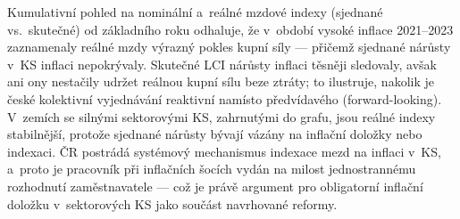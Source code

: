 Kumulativní pohled na nominální a~reálné mzdové indexy (sjednané vs.\ skutečné) od základního roku odhaluje, že v~období vysoké inflace 2021--2023 zaznamenaly reálné mzdy výrazný pokles kupní síly --- přičemž sjednané nárůsty v~\ac{KS} inflaci nepokrývaly.
Skutečné \ac{LCI} nárůsty inflaci těsněji sledovaly, avšak ani ony nestačily udržet reálnou kupní sílu beze ztráty; to ilustruje, nakolik je české kolektivní vyjednávání reaktivní namísto předvídavého (forward-looking).
V~zemích se silnými sektorovými \ac{KS}, zahrnutými do grafu, jsou reálné indexy stabilnější, protože sjednané nárůsty bývají vázány na inflační doložky nebo indexaci.
ČR postrádá systémový mechanismus indexace mezd na inflaci v~\ac{KS}, a~proto je pracovník při inflačních šocích vydán na milost jednostrannému rozhodnutí zaměstnavatele --- což je právě argument pro obligatorní inflační doložku v~sektorových \ac{KS} jako součást navrhované reformy.


